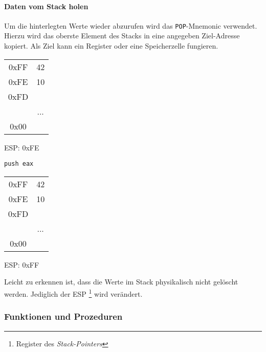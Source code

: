 \paragraph{Daten vom Stack holen\newline}
Um die hinterlegten Werte wieder abzurufen wird das \texttt{POP}-Mnemonic verwendet.
Hierzu wird das oberste Element des Stacks in eine angegeben Ziel-Adresse kopiert. Als Ziel kann ein Register oder eine Speicherzelle fungieren.  

\begin{multicols}{3}
\begin{tabular}{c|c|}
	\cline{2-2}
   0xFF & 42\\ \cline{2-2}
   0xFE & 10\\ \cline{2-2}
   0xFD & \\ \cline{2-2}
	      & ... \\ \cline{2-2}
	 0x00 & \\ \cline{2-2}
\end{tabular}
ESP: 0xFE

\begin{verbatim}push eax\end{verbatim}

\begin{tabular}{c|c|}
	\cline{2-2}
   0xFF & 42\\ \cline{2-2}
   0xFE & 10\\ \cline{2-2}
   0xFD & \\ \cline{2-2}
	      & ... \\ \cline{2-2}
	 0x00 & \\ \cline{2-2}
\end{tabular}
ESP: 0xFF
\end{multicols}

Leicht zu erkennen ist, dass die Werte im Stack physikalisch nicht gelöscht werden. Jediglich der ESP \footnote{Register des \textit{Stack-Pointers}} wird verändert.

\subsubsection{Funktionen und Prozeduren}

